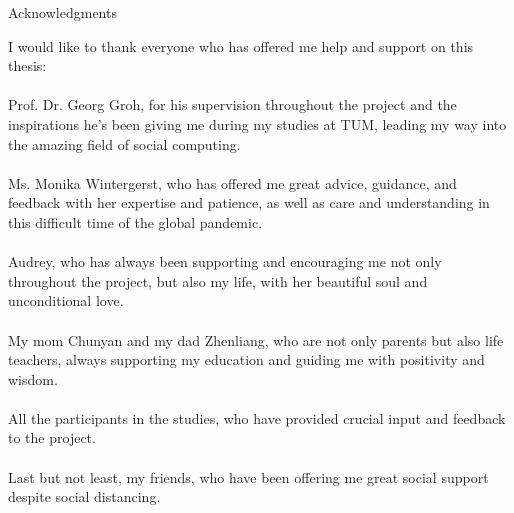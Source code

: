 \thispagestyle{empty}

\vspace*{20mm}

\begin{center}
{ Acknowledgments}
\end{center}

\vspace{10mm}

\indent I would like to thank everyone who has offered me help and support on this thesis:\\\\
\indent Prof. Dr. Georg Groh, for his supervision throughout the project and
the inspirations he's been giving me during my studies at TUM, leading my way
into the amazing field of social computing.\\\\
\indent Ms. Monika Wintergerst, who has offered me great advice, guidance, and feedback with her expertise and patience, as well as care and understanding in this difficult time of the global pandemic.\\\\
\indent Audrey, who has always been supporting and encouraging me not only throughout the project, but also my life, with her beautiful soul and unconditional love.\\\\
\indent My mom Chunyan and my dad Zhenliang, who are not only parents but also life teachers,
always supporting my education and guiding me with positivity and wisdom.\\\\
\indent All the participants in the studies, who have provided crucial input and feedback
to the project.\\\\
\indent Last but not least, my friends, who have been offering me great social support despite social distancing.

\cleardoublepage{}

